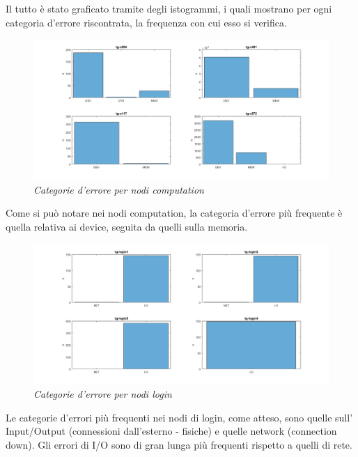 Il tutto è stato graficato tramite degli istogrammi, i quali mostrano per ogni categoria d'errore riscontrata, la frequenza con cui esso si verifica.
\begin{figure}[H]
	\centering
	\includegraphics[width=\textwidth]{img/hw6/domanda5_1.png}
	\caption{\textit{Categorie d'errore per nodi computation}}
\end{figure}
Come si può notare nei nodi computation, la categoria d'errore più frequente è quella relativa ai device, seguita da quelli sulla memoria.
\begin{figure}[H]
	\centering
	\includegraphics[width=\textwidth]{img/hw6/domanda5_2.png}
	\caption{\textit{Categorie d'errore per nodi login}}
\end{figure}
Le categorie d'errori più frequenti nei nodi di login, come atteso, sono quelle sull' Input/Output (connessioni dall'esterno - fisiche) e quelle network (connection down). Gli errori di I/O sono di gran lunga più frequenti rispetto a quelli di rete.